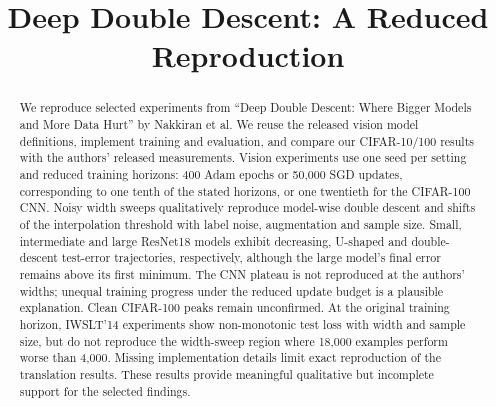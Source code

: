 \documentclass{article}
\title{Deep Double Descent: A Reduced Reproduction}
\begin{document}
\maketitle

\begin{abstract}
We reproduce selected experiments from ``Deep Double Descent: Where Bigger Models and More Data Hurt'' by Nakkiran et al. We reuse the released vision model definitions, implement training and evaluation, and compare our CIFAR-10/100 results with the authors' released measurements. Vision experiments use one seed per setting and reduced training horizons: 400 Adam epochs or 50,000 SGD updates, corresponding to one tenth of the stated horizons, or one twentieth for the CIFAR-100 CNN. Noisy width sweeps qualitatively reproduce model-wise double descent and shifts of the interpolation threshold with label noise, augmentation and sample size. Small, intermediate and large ResNet18 models exhibit decreasing, U-shaped and double-descent test-error trajectories, respectively, although the large model's final error remains above its first minimum. The CNN plateau is not reproduced at the authors' widths; unequal training progress under the reduced update budget is a plausible explanation. Clean CIFAR-100 peaks remain unconfirmed. At the original training horizon, IWSLT'14 experiments show non-monotonic test loss with width and sample size, but do not reproduce the width-sweep region where 18,000 examples perform worse than 4,000. Missing implementation details limit exact reproduction of the translation results. These results provide meaningful qualitative but incomplete support for the selected findings.
\end{abstract}
\end{document}
